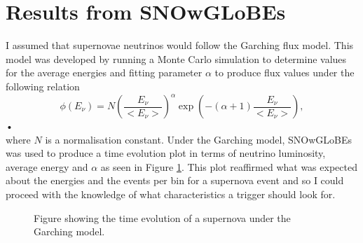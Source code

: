 \documentclass[a4paper,12,oneside,notitlepage]{report}
\begin{document}
\section*{\fontsize{11}{11}\selectfont Results from SNOwGLoBEs}
I assumed that supernovae neutrinos would follow the Garching flux model. This model was developed by running a Monte Carlo simulation to determine values for the average energies and fitting parameter $\alpha$ to produce flux values under the following relation
\begin{equation}
\phi(E_{\nu}) = N \left( \frac{E_{\nu}}{<E_{\nu}>} \right)^\alpha \exp \left( -(\alpha + 1) \frac{E_{\nu}}{<E_{\nu}>} \right),
\end{equation}•
\\where $N$ is a normalisation constant. Under the Garching model, SNOwGLoBEs was used to produce a time evolution plot in terms of neutrino luminosity, average energy and $\alpha$ as seen in Figure  \ref{fig:SnowglobesPlot1}. This plot reaffirmed what was expected about the energies and the events per bin for a supernova event and so I could proceed with the knowledge of what characteristics a trigger should look for.
\begin{figure} [H]
\begin{center}
\caption{Figure showing the time evolution of a supernova under the Garching model.  \label{fig:SnowglobesPlot1}}
\end{center}
\end{figure}
\end{document}
